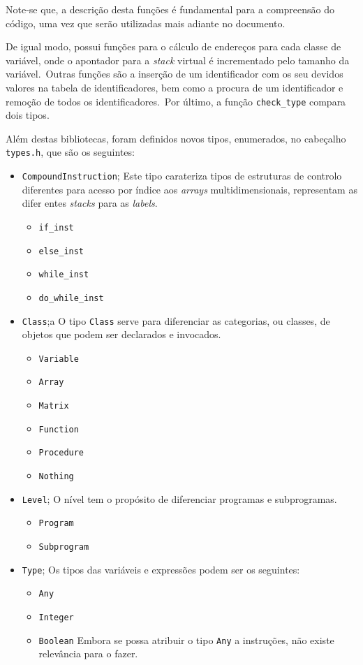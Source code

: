 Note-se que, a descrição desta funções é fundamental para a compreensão do
código, uma vez que serão utilizadas mais adiante no documento.

De igual modo, possui funções para o cálculo de endereços para cada classe de
variável, onde o apontador para a \emph{stack} virtual é incrementado pelo
tamanho da variável.\ Outras funções são a inserção de um identificador com os
seu devidos valores na tabela de identificadores, bem como a procura de um
identificador e remoção de todos os identificadores.\ Por último, a função
\texttt{check\_type} compara dois tipos.\  

Além destas bibliotecas, foram definidos novos tipos, enumerados,  no cabeçalho
\texttt{types.h}, que são os seguintes:


\begin{itemize}
\item \verb|CompoundInstruction|;
Este tipo carateriza tipos de estruturas de controlo diferentes para acesso por
índice aos \emph{arrays} multidimensionais, representam as difer
entes
\emph{stacks} para as \emph{labels}.   

\begin{itemize}
\item \texttt{if\_inst}
\item \texttt{else\_inst}
\item \texttt{while\_inst}
\item \texttt{do\_while\_inst}
\end{itemize}
\item \verb|Class|;a
O tipo \texttt{Class} serve para diferenciar as categorias, ou classes, de
objetos que podem ser declarados e invocados.
\begin{itemize}
\item \texttt{Variable}
\item \texttt{Array}
\item \texttt{Matrix}
\item \texttt{Function}
\item \texttt{Procedure}
\item \texttt{Nothing}
\end{itemize}
\item \verb|Level|;
O nível tem o propósito de diferenciar programas e subprogramas.
\begin{itemize}
\item \texttt{Program}
\item \texttt{Subprogram}
\end{itemize}
\item \verb|Type|;
Os tipos das variáveis e expressões podem ser os seguintes:
\begin{itemize}
\item \texttt{Any}
\item \texttt{Integer}
\item \texttt{Boolean}
Embora se possa atribuir o tipo \texttt{Any} a instruções, não existe
relevância para o fazer. 
\end{itemize}
\end{itemize}


